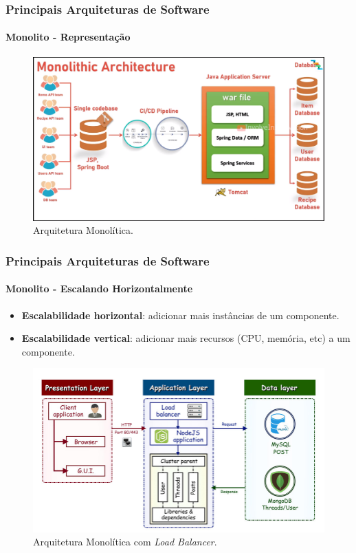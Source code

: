\documentclass[
	10pt, %
	t, %
]{beamer}
\begin{document}
\begin{frame}
	\frametitle{Principais Arquiteturas de Software}
	\framesubtitle{Monolito - Representação}
	
	\begin{figure}
		\centering
		\includegraphics[width=0.9\linewidth]{Images/monolito2.png}
		\caption{Arquitetura Monolítica.}\label{fig:monolito}
	\end{figure}

\end{frame}

\begin{frame}
	\frametitle{Principais Arquiteturas de Software}
	\framesubtitle{Monolito - Escalando Horizontalmente}

	\begin{itemize}
		\item \textbf{Escalabilidade horizontal}: adicionar mais instâncias de um componente.
		\item \textbf{Escalabilidade vertical}: adicionar mais recursos (CPU, memória, etc) a um componente.
	\end{itemize}
	
	\begin{figure}
		\centering
		\includegraphics[width=0.8\linewidth]{Images/monolito-balancer.jpg}
		\caption{Arquitetura Monolítica com \textit{Load Balancer}.}\label{fig:monolito-balancer}
	\end{figure}

\end{frame}
\end{document}
